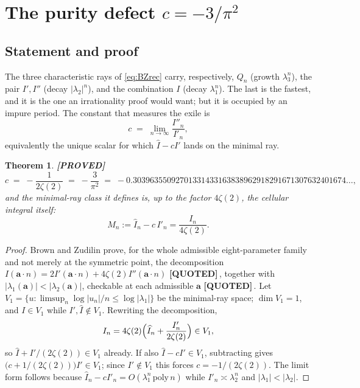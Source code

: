 \documentclass[11pt,reqno]{amsart}
\theoremstyle{plain}
\newtheorem{theorem}{Theorem}[section]
\theoremstyle{definition}
\theoremstyle{remark}
\newcommand{\PROVED}{{\normalfont\sffamily\bfseries[PROVED]}}
\newcommand{\QUOTEDMARK}{{\normalfont\sffamily\bfseries[QUOTED]}}
\newcommand{\QUOTED}[1]{\QUOTEDMARK\,#1}
\newcommand{\Ihat}{\widehat{I}}
\begin{document}
\section{The purity defect \texorpdfstring{$c=-3/\pi^2$}{c = -3/pi^2}}\label{sec:defect}

\subsection{Statement and proof}
The three characteristic rays of \eqref{eq:BZrec} carry, respectively, $Q_n$ (growth
$\lambda_3^n$), the pair $I',I''$ (decay $|\lambda_2|^n$), and the combination $I$ (decay
$\lambda_1^n$). The last is the fastest, and it is the one an irrationality proof would want; but
it is occupied by an impure period. The constant that measures the exile is
\[
  c\;=\;\lim_{n\to\infty}\frac{I''_n}{I'_n},
\]
equivalently the unique scalar for which $\Ihat-cI'$ lands on the minimal ray.

\begin{theorem}\label{thm:defect} \PROVED
\[
  c\;=\;-\frac{1}{2\zeta(2)}\;=\;-\frac{3}{\pi^2}\;=\;
  -0.30396355092701331433163838962918291671307632401674\ldots,
\]
and the minimal-ray class it defines is, up to the factor $4\zeta(2)$, the cellular integral
itself:
\[
  M_n:=\Ihat_n-c\,I'_n=\frac{I_n}{4\zeta(2)} .
\]
\end{theorem}

\begin{proof}
Brown and Zudilin prove, for the whole admissible eight-parameter family and not merely at the
symmetric point, the decomposition $I(\boldsymbol a\cdot n)=2I'(\boldsymbol a\cdot n)+
4\zeta(2)I''(\boldsymbol a\cdot n)$ \QUOTED{\cite[\S2 and \S7]{BZ}}, together with
$|\lambda_1(\boldsymbol a)|<|\lambda_2(\boldsymbol a)|$, checkable at each admissible
$\boldsymbol a$ \QUOTED{\cite[Remark 2]{BZ}}. Let
$V_1=\{u:\limsup_n\log|u_n|/n\le\log|\lambda_1|\}$ be the minimal-ray space; $\dim V_1=1$, and
$I\in V_1$ while $I',\Ihat\notin V_1$. Rewriting the decomposition,
\[
  I_n=4\zeta(2)\Bigl(\Ihat_n+\frac{I'_n}{2\zeta(2)}\Bigr)\in V_1,
\]
so $\Ihat+I'/(2\zeta(2))\in V_1$ already. If also $\Ihat-cI'\in V_1$, subtracting gives
$\bigl(c+1/(2\zeta(2))\bigr)I'\in V_1$; since $I'\notin V_1$ this forces
$c=-1/(2\zeta(2))$. The limit form follows because $\Ihat_n-cI'_n=O(\lambda_1^n\,\mathrm{poly}\,n)$
while $I'_n\asymp\lambda_2^n$ and $|\lambda_1|<|\lambda_2|$.
\end{proof}
\end{document}
